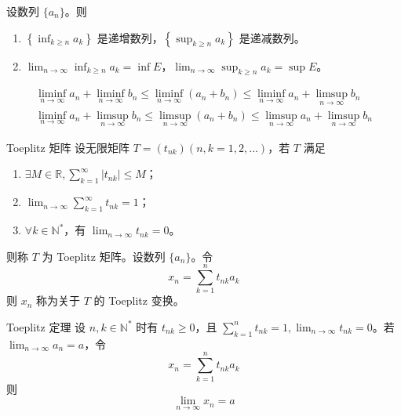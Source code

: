 \begin{theorem}
  设数列 $\{a_n\}$。则
  \begin{enumerate}[itemsep=0.5em]
    \item $\displaystyle \left\{\inf_{k \geqslant n} a_k\right\}$ 是递增数列，$\displaystyle \left\{\sup_{k \geqslant n} a_k\right\}$ 是递减数列。
    \item $\displaystyle \lim_{n \to \infty}\inf_{k \geqslant n} a_k = \inf E$，$\displaystyle \lim_{n \to \infty}\sup_{k \geqslant n} a_k = \sup E$。
  \end{enumerate}
\end{theorem}

\hfill

\begin{example}
  \begin{gather*}
    \liminf_{n \to \infty} a_n + \liminf_{n \to \infty} b_n \leqslant \liminf_{n \to \infty} (a_n + b_n) \leqslant \liminf_{n \to \infty} a_n + \limsup_{n \to \infty} b_n \\
    \liminf_{n \to \infty} a_n + \limsup_{n \to \infty} b_n \leqslant \limsup_{n \to \infty} (a_n + b_n) \leqslant \limsup_{n \to \infty} a_n + \limsup_{n \to \infty} b_n
  \end{gather*}
\end{example}

\hfill

\begin{definition}{Toeplitz 矩阵}
  设无限矩阵 $T = (t_{nk})(n, k = 1,2, \ldots)$，若 $T$ 满足
  \begin{enumerate}
    \item $\exists M \in \mathbb{R}, \displaystyle \sum_{k = 1}^{\infty} |t_{nk}| \leqslant M$；
    \item $\displaystyle \lim_{n \to \infty}\sum_{k = 1}^{\infty} t_{nk} = 1$；
    \item $\forall k \in \mathbb{N}^{*}$，有 $\displaystyle \lim_{n \to \infty} t_{nk} = 0$。
  \end{enumerate}
  则称 $T$ 为 Toeplitz 矩阵。设数列 $\{a_n\}$。令
  \[x_n = \sum_{k = 1}^{n} t_{nk}a_{k}\]
  则 $x_n$ 称为关于 $T$ 的 Toeplitz 变换。
\end{definition}

\begin{theorem}{Toeplitz 定理}
  设 $n, k \in \mathbb{N}^{*}$ 时有 $t_{nk} \geqslant 0$，且 $\displaystyle \sum_{k = 1}^{n} t_{nk} = 1, \lim_{n \to \infty} t_{nk} = 0$。若 $\displaystyle \lim_{n \to \infty} a_n = a$，令
  \[x_n = \sum_{k = 1}^{n} t_{nk}a_{k}\]
  则
  \[\lim_{n \to \infty} x_n = a\]
\end{theorem}


